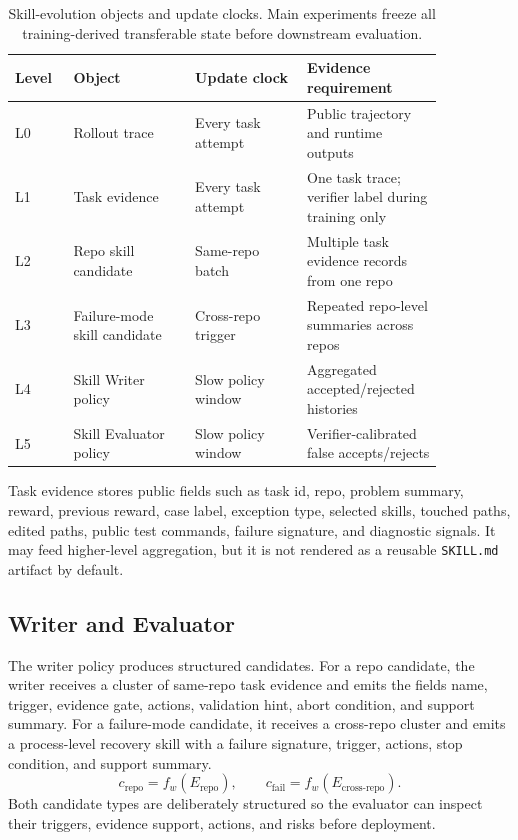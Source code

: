 \documentclass{article}
\begin{document}
\begin{table}[t]
\caption{Skill-evolution objects and update clocks. Main experiments freeze all
training-derived transferable state before downstream evaluation.}
\label{tab:levels}
\begin{center}
\begin{tabular}{L{0.12\linewidth} L{0.25\linewidth} L{0.23\linewidth} L{0.25\linewidth}}
\toprule
Level & Object & Update clock & Evidence requirement \\
\midrule
L0 & Rollout trace & Every task attempt & Public trajectory and runtime outputs \\
L1 & Task evidence & Every task attempt & One task trace; verifier label during training only \\
L2 & Repo skill candidate & Same-repo batch & Multiple task evidence records from one repo \\
L3 & Failure-mode skill candidate & Cross-repo trigger & Repeated repo-level summaries across repos \\
L4 & Skill Writer policy & Slow policy window & Aggregated accepted/rejected histories \\
L5 & Skill Evaluator policy & Slow policy window & Verifier-calibrated false accepts/rejects \\
\bottomrule
\end{tabular}
\end{center}
\end{table}

Task evidence stores public fields such as task id, repo, problem summary,
reward, previous reward, case label, exception type, selected skills, touched
paths, edited paths, public test commands, failure signature, and diagnostic
signals. It may feed higher-level aggregation, but it is not rendered as a
reusable \texttt{SKILL.md} artifact by default.

\subsection{Writer and Evaluator}

The writer policy produces structured candidates. For a repo candidate, the
writer receives a cluster of same-repo task evidence and emits the fields
name, trigger, evidence gate, actions, validation hint, abort condition, and
support summary. For a failure-mode candidate, it receives a cross-repo cluster
and emits a process-level recovery skill with a failure signature, trigger,
actions, stop condition, and support summary.
\[
c_{\mathrm{repo}} = f_w(E_{\mathrm{repo}}), \qquad
c_{\mathrm{fail}} = f_w(E_{\mathrm{cross\text{-}repo}}).
\]
Both candidate types are deliberately structured so the evaluator can inspect
their triggers, evidence support, actions, and risks before deployment.
\end{document}

